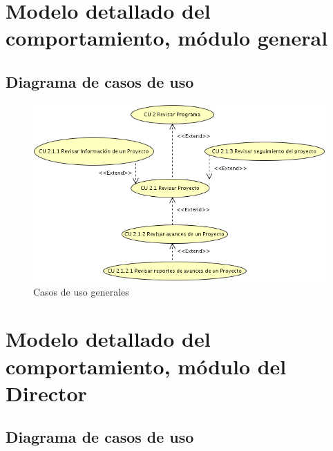 \documentclass[10pt]{book}
\begin{document}
\chapter{Modelo detallado del comportamiento, módulo general} 

\section{Diagrama de casos de uso}

\begin{figure}[htbp!]
	\begin{center}
		\includegraphics[width=.8\textwidth]{images/CU/general}
		\caption{Casos de uso generales}
		\label{fig:default}
	\end{center}
\end{figure}


\chapter{Modelo detallado del comportamiento, módulo del Director} 

\section{Diagrama de casos de uso}
\end{document}
